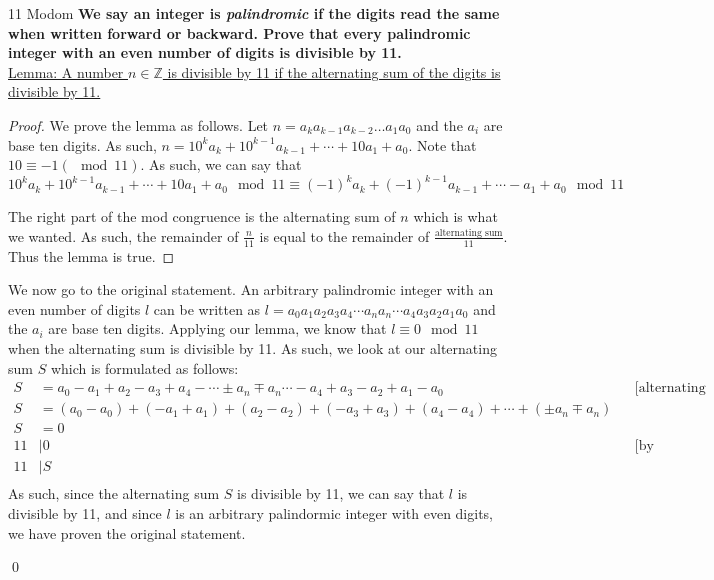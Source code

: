 \documentclass[11pt, nopagenumbers]{adamblan-hw}
\begin{document}
\begin{question}{11 Modom}
\textbf{We say an integer is \textit{palindromic} if the digits read the same when written forward or backward. Prove that
every palindromic integer with an even number of digits is divisible by 11.} \\

\underline{Lemma: A number $n \in \mathbb{Z}$ is divisible by 11 if the alternating sum of the digits is divisible by 11.}

\begin{proof}
We prove the lemma as follows. Let $n = a_ka_{k-1}a_{k-2} \dots a_1a_0$
and the $a_i$ are base ten digits. As such, $n = 10^ka_k + 10^{k-1}a_{k - 1} + \cdots + 10a_1 + a_0$.
Note that $10 \equiv -1 (\mod{11})$. As such, we can say that 
$$10^ka_k + 10^{k-1}a_{k - 1} + \cdots + 10a_1 + a_0 \mod{11} \equiv (-1)^ka_k + (-1)^{k-1}a_{k - 1} + \cdots - a_1 + a_0 \mod{11}$$

The right part of the mod congruence is the alternating sum of $n$ which is what we wanted.
As such, the remainder of $\frac{n}{11}$ is equal to the remainder of $\frac{\text{alternating sum}}{11}$. Thus
the lemma is true.
\end{proof}

We now go to the original statement. An arbitrary palindromic integer with an even number of digits $l$ can be written as 
$l = a_0a_1a_2a_3a_4 \cdots a_na_n \cdots a_4a_3a_2a_1a_0$ and the $a_i$ are base ten digits.
Applying our lemma, we know that $l \equiv 0 \mod{11}$ when the alternating sum is divisible by 11.
As such, we look at our alternating sum $S$ which is formulated as follows:
\begin{align*}
S &= a_0 - a_1 + a_2 - a_3 + a_4 - \cdots \pm a_n \mp a_n \cdots - a_4 + a_3 - a_2 + a_1 - a_0 && \text{[alternating sum]} \\
S &= (a_0 - a_0) + (-a_1 + a_1) + (a_2 - a_2) + (-a_3 + a_3) + (a_4 - a_4) + \cdots + (\pm a_n \mp a_n) \\
S &= 0\\
11 &| 0 && \text{[by definition of | ]} \\
11 &| S \\
\end{align*}
As such, since the alternating sum $S$ is divisible by 11, we can say that $l$ is divisible by 11, and since $l$ is 
an arbitrary palindormic integer with even digits, we have proven the original statement.

\qed

\end{question}
\end{document}
